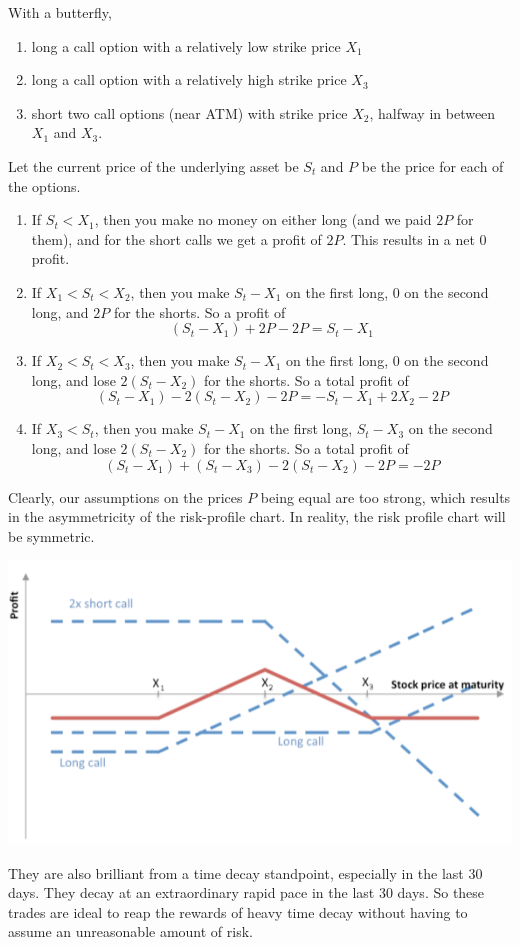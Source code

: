 \documentclass{article}
\begin{document}
  \begin{definition}
    With a butterfly, 
    \begin{enumerate}
      \item long a call option with a relatively low strike price $X_1$ 
      \item long a call option with a relatively high strike price $X_3$ 
      \item short two call options (near ATM) with strike price $X_2$, halfway in between $X_1$ and $X_3$. 
    \end{enumerate}
    Let the current price of the underlying asset be $S_t$ and $P$ be the price for each of the options. 
    \begin{enumerate}
      \item If $S_t < X_1$, then you make no money on either long (and we paid $2P$ for them), and for the short calls we get a profit of $2P$. This results in a net $0$ profit. 
      \item If $X_1 < S_t < X_2$, then you make $S_t - X_1$ on the first long, $0$ on the second long, and $2P$ for the shorts. So a profit of 
      \[(S_t - X_1) + 2P - 2P = S_t - X_1 \]
      \item If $X_2 < S_t < X_3$, then you make $S_t - X_1$ on the first long, $0$ on the second long, and lose $2 (S_t - X_2)$ for the shorts. So a total profit of 
      \[(S_t - X_1) - 2 (S_t - X_2) - 2P = - S_t - X_1 + 2X_2 - 2P\]
      \item If $X_3 < S_t$, then you make $S_t - X_1$ on the first long, $S_t - X_3$ on the second long, and lose $2 (S_t - X_2)$ for the shorts. So a total profit of  
      \[(S_t - X_1) + (S_t - X_3) - 2 (S_t - X_2) - 2P = -2P\]
    \end{enumerate}
    Clearly, our assumptions on the prices $P$ being equal are too strong, which results in the asymmetricity of the risk-profile chart. In reality, the risk profile chart will be symmetric. 
    \begin{center}
      \includegraphics[scale=0.5]{img/butterfly_long.png}
    \end{center}
  \end{definition}

  They are also brilliant from a time decay standpoint, especially in the last 30 days. They decay at an extraordinary rapid pace in the last 30 days. So these trades are ideal to reap the rewards of heavy time decay without having to assume an unreasonable amount of risk. 
\end{document}
